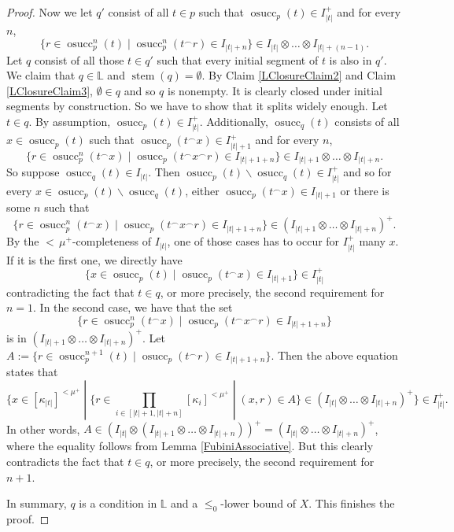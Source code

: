 \documentclass[10pt,a4paper]{amsart}
\DeclareMathOperator{\osucc}{osucc}
\DeclareMathOperator{\stem}{stem}
\newcommand{\dL}{\mathbb{L}}
\begin{document}
\begin{proof}
		Now we let $q'$ consist of all $t\in p$ such that $\osucc_p(t)\in I_{|t|}^+$ and for every $n$,
		$$\{r\in\osucc_p^n(t)\;|\;\osucc_p^n(t^{\frown}r)\in I_{|t|+n}\}\in I_{|t|}\otimes\dots\otimes I_{|t|+(n-1)}.$$
		Let $q$ consist of all those $t\in q'$ such that every initial segment of $t$ is also in $q'$. We claim that $q\in\dL$ and $\stem(q)=\emptyset$. By Claim \ref{LClosureClaim2} and Claim \ref{LClosureClaim3}, $\emptyset\in q$ and so $q$ is nonempty. It is clearly closed under initial segments by construction. So we have to show that it splits widely enough. Let $t\in q$. By assumption, $\osucc_p(t)\in I_{|t|}^+$. Additionally, $\osucc_q(t)$ consists of all $x\in\osucc_p(t)$ such that $\osucc_p(t^{\frown}x)\in I_{|t|+1}^+$ and for every $n$,
		$$\{r\in\osucc_p^n(t^{\frown}x)\;|\;\osucc_p(t^{\frown}x^{\frown}r)\in I_{|t|+1+n}\}\in I_{|t|+1}\otimes\dots\otimes I_{|t|+n}.$$
		So suppose $\osucc_q(t)\in I_{|t|}$. Then $\osucc_p(t)\smallsetminus\osucc_q(t)\in I_{|t|}^+$ and so for every $x\in\osucc_p(t)\smallsetminus\osucc_q(t)$, either $\osucc_p(t^{\frown}x)\in I_{|t|+1}$ or there is some $n$ such that
		$$\{r\in\osucc_p^n(t^{\frown}x)\;|\;\osucc_p(t^{\frown}x^{\frown}r)\in I_{|t|+1+n}\}\in (I_{|t|+1}\otimes\dots\otimes I_{|t|+n})^+.$$
		By the ${<}\,\mu^+$-completeness of $I_{|t|}$, one of those cases has to occur for $I_{|t|}^+$ many $x$. If it is the first one, we directly have
		$$\{x\in\osucc_p(t)\;|\;\osucc_p(t^{\frown}x)\in I_{|t|+1}\}\in I_{|t|}^+$$
		contradicting the fact that $t\in q$, or more precisely, the second requirement for $n=1$. In the second case, we have that the set
		$$\{r\in\osucc_p^n(t^{\frown}x)\;|\;\osucc_p(t^{\frown}x^{\frown}r)\in I_{|t|+1+n}\}$$
		is in $(I_{|t|+1}\otimes\dots\otimes I_{|t|+n})^+$. Let $A:=\{r\in\osucc_p^{n+1}(t)\;|\;\osucc_p(t^{\frown}r)\in I_{|t|+1+n}\}$. Then the above equation states that
		$$\{x\in [\kappa_{|t|}]^{<\mu^+}\;|\;\{r\in\prod_{i\in[|t|+1,|t|+n]}[\kappa_i]^{<\mu^+}\;|\;(x,r)\in A\}\in(I_{|t|}\otimes\dots\otimes I_{|t|+n})^+\}\in I_{|t|}^+.$$
		In other words, $A\in(I_{|t|}\otimes(I_{|t|+1}\otimes\dots\otimes I_{|t|+n}))^+=(I_{|t|}\otimes\dots\otimes I_{|t|+n})^+$, where the equality follows from Lemma \ref{FubiniAssociative}. But this clearly contradicts the fact that $t\in q$, or more precisely, the second requirement for $n+1$.
		
		In summary, $q$ is a condition in $\dL$ and a $\leq_0$-lower bound of $X$. This finishes the proof.
	\end{proof}
\end{document}
